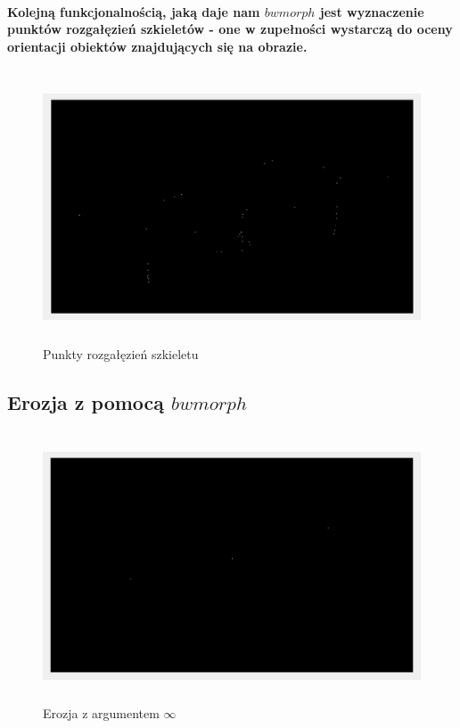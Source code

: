 \documentclass[a4paper,12pt]{article}
\begin{document}
\begin{justify}
\newpage

\paragraph{Kolejną funkcjonalnością, jaką daje nam $bwmorph$ jest wyznaczenie punktów rozgałęzień szkieletów - one w zupełności wystarczą do oceny orientacji obiektów znajdujących się na obrazie.}

\begin{figure}[h]
\centering
\includegraphics[width=12cm, height=8cm]{2_3}
\caption{Punkty rozgałęzień szkieletu}
\end{figure}

\subsection{Erozja z pomocą $bwmorph$}

\begin{figure}[h]
\centering
\includegraphics[width=12cm, height=8cm]{3}
\caption{Erozja z argumentem $\infty$}
\end{figure}


\end{justify}
\end{document}
